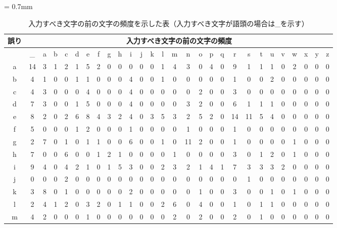 {\tabcolsep = 0.7mm
 \begin{table*}[]
  \small
  \begin{center}
   \caption{入力すべき文字の前の文字の頻度を示した表（入力すべき文字が語頭の場合は\_を示す）}
   \begin{tabular}{|c|c|c|c|c|c|c|c|c|c|c|c|c|c|c|c|c|c|c|c|c|c|c|c|c|c|c|c|} \hline
誤り & \multicolumn{27}{|c|}{入力すべき文字の前の文字の頻度} \\ \hline
 & \_ & a & b & c & d & e & f & g & h & i & j & k & l & m & n & o & p & q & r & s & t & u & v & w & x & y & z \\ \hline
a & 14 & 3 & 1 & 2 & 1 & 5 & 2 & 0 & 0 & 0 & 0 & 0 & 1 & 4 & 3 & 0 & 4 & 0 & 9 & 1 & 1 & 1 & 0 & 2 & 0 & 0 & 0 \\ \hline
b & 4 & 1 & 0 & 0 & 1 & 1 & 0 & 0 & 0 & 4 & 0 & 0 & 1 & 0 & 0 & 0 & 0 & 0 & 1 & 0 & 0 & 2 & 0 & 0 & 0 & 0 & 0 \\ \hline
c & 4 & 3 & 0 & 0 & 0 & 4 & 0 & 0 & 0 & 4 & 0 & 0 & 0 & 0 & 0 & 2 & 0 & 0 & 3 & 0 & 0 & 0 & 0 & 0 & 0 & 0 & 0 \\ \hline
d & 7 & 3 & 0 & 0 & 1 & 5 & 0 & 0 & 0 & 4 & 0 & 0 & 0 & 0 & 3 & 2 & 0 & 0 & 6 & 1 & 1 & 1 & 0 & 0 & 0 & 0 & 0 \\ \hline
e & 8 & 2 & 0 & 2 & 6 & 8 & 4 & 3 & 2 & 4 & 0 & 3 & 5 & 3 & 2 & 5 & 2 & 0 & 14 & 11 & 5 & 4 & 0 & 0 & 0 & 0 & 0 \\ \hline
f & 5 & 0 & 0 & 0 & 1 & 2 & 0 & 0 & 0 & 1 & 0 & 0 & 0 & 0 & 1 & 0 & 0 & 0 & 1 & 0 & 0 & 0 & 0 & 0 & 0 & 0 & 0 \\ \hline
g & 2 & 7 & 0 & 1 & 0 & 1 & 1 & 0 & 0 & 6 & 0 & 0 & 1 & 0 & 11 & 2 & 0 & 0 & 1 & 0 & 0 & 0 & 0 & 1 & 0 & 0 & 0 \\ \hline
h & 7 & 0 & 0 & 6 & 0 & 0 & 1 & 2 & 1 & 0 & 0 & 0 & 0 & 1 & 0 & 0 & 0 & 0 & 3 & 0 & 1 & 2 & 0 & 1 & 0 & 0 & 0 \\ \hline
i & 9 & 4 & 0 & 4 & 2 & 1 & 0 & 1 & 5 & 3 & 0 & 0 & 2 & 3 & 2 & 1 & 4 & 1 & 7 & 3 & 3 & 3 & 2 & 0 & 0 & 0 & 0 \\ \hline
j & 0 & 0 & 0 & 2 & 0 & 0 & 0 & 0 & 0 & 0 & 0 & 0 & 0 & 0 & 0 & 0 & 0 & 0 & 0 & 1 & 0 & 0 & 0 & 0 & 0 & 0 & 0 \\ \hline
k & 3 & 8 & 0 & 1 & 0 & 0 & 0 & 0 & 0 & 2 & 0 & 0 & 0 & 0 & 0 & 1 & 0 & 0 & 3 & 0 & 0 & 1 & 0 & 1 & 0 & 0 & 0 \\ \hline
l & 2 & 4 & 1 & 2 & 0 & 3 & 2 & 0 & 1 & 1 & 0 & 0 & 2 & 6 & 0 & 4 & 0 & 0 & 1 & 0 & 1 & 1 & 0 & 0 & 0 & 0 & 0 \\ \hline
m & 4 & 2 & 0 & 0 & 0 & 1 & 0 & 0 & 0 & 0 & 0 & 0 & 0 & 2 & 0 & 2 & 0 & 0 & 2 & 0 & 1 & 0 & 0 & 0 & 0 & 0 & 0 \\ \hline

\end{tabular}
\end{center}
\end{table*}}
